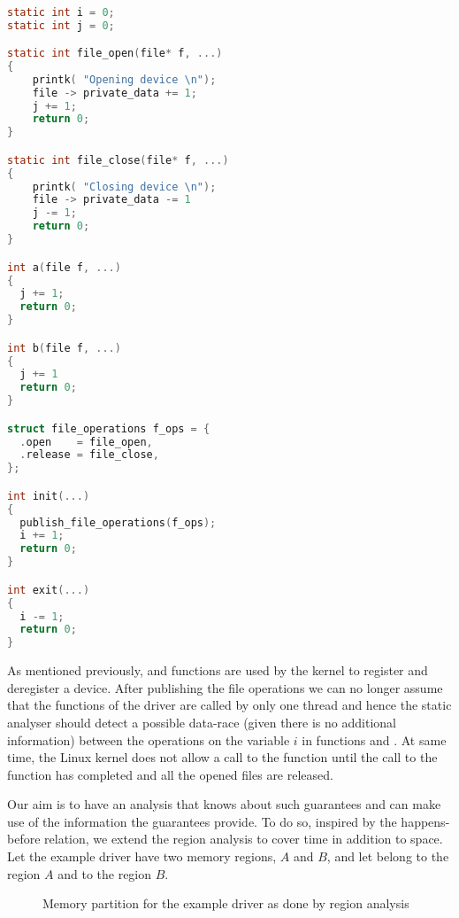 \documentclass[..thesis.tex]{subfiles}
\newcommand{\opacity}{0.8}
\begin{document}
\begin{lstlisting}[language=c,style=def]

static int i = 0;
static int j = 0;

static int file_open(file* f, ...)
{
    printk( "Opening device \n");
    file -> private_data += 1;
    j += 1;
    return 0;
}

static int file_close(file* f, ...)
{
    printk( "Closing device \n");
    file -> private_data -= 1
    j -= 1;
    return 0;
}

int a(file f, ...)
{
  j += 1;
  return 0;
}

int b(file f, ...)
{
  j += 1
  return 0;
}

struct file_operations f_ops = {
  .open    = file_open,
  .release = file_close,
};

int init(...)
{
  publish_file_operations(f_ops);
  i += 1;
  return 0;
}

int exit(...)
{
  i -= 1;
  return 0;
}

\end{lstlisting}

As mentioned previously,  and  functions are used by the kernel to register and deregister a device.
After publishing the file operations we can no longer assume that the functions of the driver are called by only one thread and
hence the static analyser should detect a possible data-race (given there is no additional information) between the operations on the variable $i$ in functions  and . 
At same time, the Linux kernel does not allow a call to the  function until the call to the  function has completed and all the opened files are released.

Our aim is to have an analysis that knows about such guarantees and can make use of the information the guarantees provide.
%
%
To do so, inspired by the happens-before relation,  we extend the region analysis to cover time in addition to space.
%
%
Let the example driver have two memory regions, $A$ and $B$, and let  belong to the region $A$ and  to the region $B$.

\begin{figure}[H]
  \centering
    \caption{Memory partition for the example driver as done by region analysis}
\end{figure}
\end{document}
